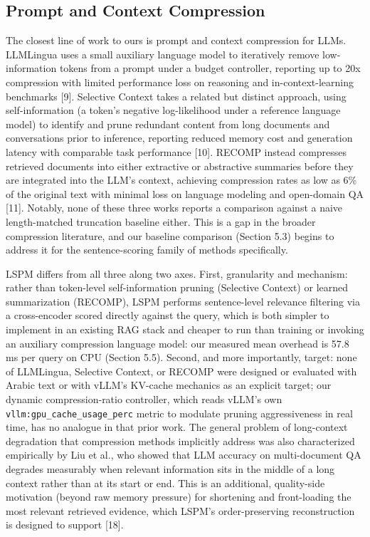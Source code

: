 \subsection{Prompt and Context Compression}
The closest line of work to ours is prompt and context compression for LLMs. LLMLingua uses a small auxiliary language model to iteratively remove low-information tokens from a prompt under a budget controller, reporting up to 20x compression with limited performance loss on reasoning and in-context-learning benchmarks [9]. Selective Context takes a related but distinct approach, using self-information (a token's negative log-likelihood under a reference language model) to identify and prune redundant content from long documents and conversations prior to inference, reporting reduced memory cost and generation latency with comparable task performance [10]. RECOMP instead compresses retrieved documents into either extractive or abstractive summaries before they are integrated into the LLM's context, achieving compression rates as low as 6\% of the original text with minimal loss on language modeling and open-domain QA [11]. Notably, none of these three works reports a comparison against a naive length-matched truncation baseline either. This is a gap in the broader compression literature, and our baseline comparison (Section 5.3) begins to address it for the sentence-scoring family of methods specifically.

LSPM differs from all three along two axes. First, granularity and mechanism: rather than token-level self-information pruning (Selective Context) or learned summarization (RECOMP), LSPM performs sentence-level relevance filtering via a cross-encoder scored directly against the query, which is both simpler to implement in an existing RAG stack and cheaper to run than training or invoking an auxiliary compression language model: our measured mean overhead is 57.8 ms per query on CPU (Section 5.5). Second, and more importantly, target: none of LLMLingua, Selective Context, or RECOMP were designed or evaluated with Arabic text or with vLLM's KV-cache mechanics as an explicit target; our dynamic compression-ratio controller, which reads vLLM's own \texttt{vllm:gpu\_cache\_usage\_perc} metric to modulate pruning aggressiveness in real time, has no analogue in that prior work. The general problem of long-context degradation that compression methods implicitly address was also characterized empirically by Liu et al., who showed that LLM accuracy on multi-document QA degrades measurably when relevant information sits in the middle of a long context rather than at its start or end. This is an additional, quality-side motivation (beyond raw memory pressure) for shortening and front-loading the most relevant retrieved evidence, which LSPM's order-preserving reconstruction is designed to support [18].

